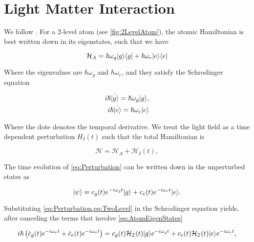 \chapter{Light Matter Interaction}\label{ch:LightMatter}

We follow \cite{Leeuwen2017}. For a 2-level atom (see \cref{fig:2LevelAtom}), the atomic Hamiltonian is best written down in its eigenstates, such that we have 

\begin{equation}\label{eq:AtomHamiltonian}
	\mathcal{H}_A = \hbar \omega_g \lvert g\rangle\langle g\rvert + \hbar \omega_e \lvert e\rangle\langle e\rvert
\end{equation}

Where the eigenvalues are $\hbar \omega_g$ and $\hbar \omega_e$, and they satisfy the Schrodinger equation

\begin{subequations}\label{eq:AtomEigenStates}
	\begin{align}
		i \hbar \dot{\lvert g\rangle}= \hbar \omega_g \lvert g\rangle, \\
		i \hbar \dot{\lvert e\rangle}= \hbar \omega_e \lvert e\rangle
	\end{align}
\end{subequations}

Where the dote denotes the temporal derivative. We treat the light field as a time dependent perturbation $H_{I}(t)$ such that the total Hamiltonian is

\begin{equation}\label{eq:Perturbation}
	\mathcal{H} = \mathcal{H}_A + \mathcal{H}_{I}(t),
\end{equation}

The time evolution of \cref{eq:Perturbation} can be written down in the unperturbed states as

\begin{equation}\label{eq:TwoLevel}
	\lvert\psi\rangle = c_g(t) e^{-i \omega_g t} \lvert g\rangle + c_e(t) e^{-i \omega_e t} \lvert e\rangle.
\end{equation}

Substituting \cref{eq:Perturbation,eq:TwoLevel} in the Schrodinger equation yields, after canceling the terms that involve \cref{eq:AtomEigenStates} 

\begin{equation}\label{eq:TwoLevelSchroedinger}
	i \hbar \left(\dot{c}_g(t) e^{-i \omega_e t}+\dot{c}_e(t) e^{-i \omega_e t} \right) = c_g(t) \mathcal{H_I}(t)\lvert g\rangle e^{-i \omega_g t} + c_e(t) \mathcal{H_I}(t) \lvert e\rangle e^{-i \omega_e t},
\end{equation}

